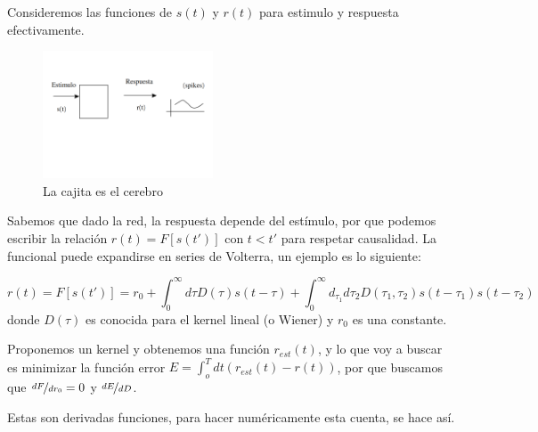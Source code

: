 Consideremos las funciones de $s(t)$ y $r(t)$ para estimulo y respuesta efectivamente. 

\begin{figure}[H]
	\centering
	\includegraphics[width=0.45\textwidth]{3-1.png}
	\caption{La cajita es el cerebro}
\end{figure}

Sabemos que dado la red, la respuesta depende del estímulo, por que podemos escribir la relación $r(t) =  F[s(t')]$ con $t<t'$ para respetar causalidad. La funcional puede expandirse en series de Volterra, un ejemplo es lo siguiente:

\begin{equation}
	r(t) = F[s(t')]= r_0 + \int_0^\infty d\tau D(\tau) s(t-\tau) + \int_0^\infty d_{\tau_1} d \tau_2 D(\tau_1, \tau_2) s(t-\tau_1) s(t-\tau_2)
\end{equation}
donde $D(\tau)$ es conocida para el kernel lineal (o Wiener) y $r_0$ es una constante.

Proponemos un kernel y obtenemos una función $r_{est}(t)$, y lo que voy a buscar es minimizar la función error $E = \int_o^T dt (r_{est}(t)-r(t))$, por que buscamos que $\nicefrac{dF}{dr_0}=0$ y $\nicefrac{dE}{dD}$.

Estas son derivadas funciones, para hacer numéricamente esta cuenta, se hace así.

